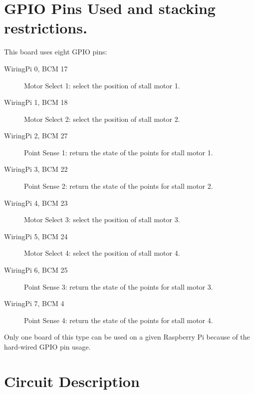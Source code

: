 \section{GPIO Pins Used and stacking restrictions.}

This board uses eight GPIO pins:

\begin{description}
\item[WiringPi 0, BCM 17] Motor Select 1: select the position of stall motor 
1. 
\item[WiringPi 1, BCM 18] Motor Select 2: select the position of stall motor 
2. 
\item[WiringPi 2, BCM 27] Point Sense 1: return the state of the points for 
stall motor 1. 
\item[WiringPi 3, BCM 22] Point Sense 2: return the state of the points for 
stall motor 2. 
\item[WiringPi 4, BCM 23] Motor Select 3: select the position of stall motor 
3. 
\item[WiringPi 5, BCM 24] Motor Select 4: select the position of stall motor 
4. 
\item[WiringPi 6, BCM 25] Point Sense 3: return the state of the points for 
stall motor 3. 
\item[WiringPi 7, BCM 4] Point Sense 4: return the state of the points for 
stall motor 4. 
\end{description}

Only one board of this type can be used on a given Raspberry Pi because of the 
hard-wired GPIO pin usage.

\section{Circuit Description}

